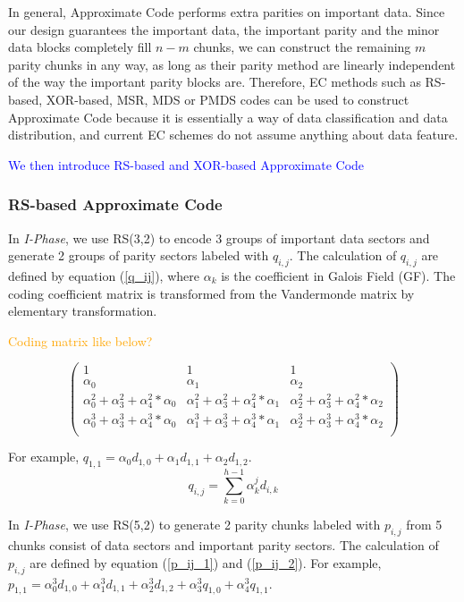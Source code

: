\documentclass[sigconf]{acmart}
\begin{document}
In general, Approximate Code performs extra parities on important data.
Since our design guarantees the important data, the important parity and the minor data blocks completely fill $n-m$ chunks, we can construct the remaining $m$ parity chunks in any way, as long as their parity method are linearly independent of the way the important parity blocks are. Therefore, EC methods such as RS-based, XOR-based, MSR, MDS or PMDS codes can be used to construct Approximate Code because it is essentially a way of data classification and data distribution, and current EC schemes do not assume anything about data feature.

\textcolor{blue}{We then introduce RS-based and XOR-based Approximate Code}
\subsubsection{RS-based Approximate Code}

In \emph{I-Phase}, we use RS(3,2) to encode 3 groups of important data sectors and generate 2 groups of parity sectors labeled with $q_{i,j}$. The calculation of $q_{i,j}$ are defined by equation (\ref{q_ij}), where $\alpha_k$ is the coefficient in Galois Field (GF). The coding coefficient matrix is transformed from the Vandermonde matrix by elementary transformation.

\textcolor{orange}{Coding matrix like below?}

\begin{equation}
\begin{pmatrix} 
1&  1&  1\\
\alpha_0 & \alpha_1 & \alpha_2 \\
\alpha_0^2+\alpha_3^2+\alpha_4^2*\alpha_0 & \alpha_1^2 +\alpha_3^2+\alpha_4^2*\alpha_1 & \alpha_2^2+\alpha_3^2+\alpha_4^2*\alpha_2  \\
\alpha_0^3+\alpha_3^3+\alpha_4^3*\alpha_0 & \alpha_1^3 +\alpha_3^3+\alpha_4^3*\alpha_1 & \alpha_2^3+\alpha_3^3+\alpha_4^3*\alpha_2  \\
\end{pmatrix} 
\end{equation}

For example, $q_{1,1} = \alpha_0 d_{1,0} + \alpha_1 d_{1,1} + \alpha_2 d_{1,2}$.
\begin{equation}\label{q_ij}
    q_{i,j} = \sum_{k=0}^{h-1} \alpha_k^{j} d_{i,k}
\end{equation}

In \emph{I-Phase}, we use RS(5,2) to generate 2 parity chunks labeled with $p_{i,j}$ from 5 chunks consist of data sectors and important parity sectors. The calculation of $p_{i,j}$ are defined by equation (\ref{p_ij_1}) and (\ref{p_ij_2}).
For example, $p_{1,1} = \alpha_0^3 d_{1,0} + \alpha_1^3 d_{1,1} + \alpha_2^3 d_{1,2} + \alpha_3^3 q_{1,0} + \alpha_4^3 q_{1,1}$.
\end{document}
